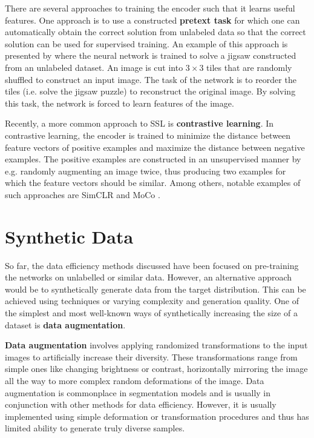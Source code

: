 There are several approaches to training the encoder such that it learns useful features.
One approach is to use a constructed \textbf{pretext task} for which one
can automatically obtain the correct solution from unlabeled data so that the correct solution can be used
for supervised training. An example of this approach is presented by 
\citet{norooziUnsupervisedLearningVisual2016} where the neural network is trained to 
solve a jigsaw constructed from an unlabeled dataset. An image is cut into $3 \times 3$ tiles that are randomly shuffled to construct an input image. The task of the network is to reorder the tiles (i.e. solve the jigsaw puzzle) to reconstruct the original image. By solving this task, the network is forced to learn features of the image.


Recently, a more common approach to SSL is \textbf{contrastive learning}.
In contrastive learning, the encoder is trained to minimize the distance between feature
vectors of positive examples and maximize the distance between negative examples. The
positive examples are constructed in an unsupervised manner by e.g. randomly augmenting
an image twice, thus producing two examples for which the feature vectors should be
similar. Among others, notable examples of such approaches are SimCLR 
\cite{chenSimpleFrameworkContrastive2020} and MoCo \cite{he2019moco}.

\section{Synthetic Data}

So far, the data efficiency methods discussed have been focused on pre-training the networks on unlabelled or similar data. However, an alternative approach would be to synthetically generate data from the target distribution. This can be achieved using techniques or varying complexity and generation quality. One of the simplest and most well-known ways of synthetically increasing the size of a dataset is \textbf{data augmentation}. 

\textbf{Data augmentation} involves applying randomized transformations to the input images to artificially increase their diversity. These transformations range from simple ones like changing brightness or contrast, horizontally mirroring the image all the way to more complex random deformations of the image. Data augmentation is commonplace in segmentation models and is usually in conjunction with other methods for data efficiency. However, it is usually implemented using simple deformation or transformation procedures and thus has limited ability to generate truly diverse samples.

